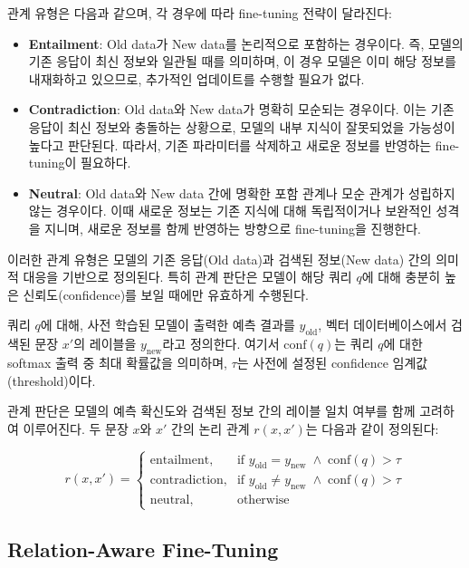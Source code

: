 \documentclass[a4paper,fleqn]{cas-sc}
\begin{document}
관계 유형은 다음과 같으며, 각 경우에 따라 fine-tuning 전략이 달라진다:

\begin{itemize}
    \item{\textbf{Entailment}:
    Old data가 New data를 논리적으로 포함하는 경우이다. 즉, 모델의 기존 응답이 최신 정보와 일관될 때를 의미하며, 이 경우 모델은 이미 해당 정보를 내재화하고 있으므로, 추가적인 업데이트를 수행할 필요가 없다.}
    \item{\textbf{Contradiction}:
    Old data와 New data가 명확히 모순되는 경우이다. 이는 기존 응답이 최신 정보와 충돌하는 상황으로, 모델의 내부 지식이 잘못되었을 가능성이 높다고 판단된다. 
    따라서, 기존 파라미터를 삭제하고 새로운 정보를 반영하는 fine-tuning이 필요하다.}
    \item{\textbf{Neutral}:
    Old data와 New data 간에 명확한 포함 관계나 모순 관계가 성립하지 않는 경우이다. 이때 새로운 정보는 기존 지식에 대해 독립적이거나 보완적인 성격을 지니며, 새로운 정보를 함께 반영하는 방향으로 fine-tuning을 진행한다.
    }
\end{itemize}  
이러한 관계 유형은 모델의 기존 응답(Old data)과 검색된 정보(New data) 간의 의미적 대응을 기반으로 정의된다.  
특히 관계 판단은 모델이 해당 쿼리 \( q \)에 대해 충분히 높은 신뢰도(confidence)를 보일 때에만 유효하게 수행된다.

쿼리 \( q \)에 대해, 사전 학습된 모델이 출력한 예측 결과를 \( y_{\text{old}} \), 벡터 데이터베이스에서 검색된 문장 \( x' \)의 레이블을 \( y_{\text{new}} \)라고 정의한다.  
여기서 \( \mathrm{conf}(q) \)는 쿼리 \( q \)에 대한 softmax 출력 중 최대 확률값을 의미하며, \( \tau \)는 사전에 설정된 confidence 임계값(threshold)이다.  

관계 판단은 모델의 예측 확신도와 검색된 정보 간의 레이블 일치 여부를 함께 고려하여 이루어진다.  
두 문장 \( x \)와 \( x' \) 간의 논리 관계 \( r(x, x') \)는 다음과 같이 정의된다:

\begin{equation}
    r(x, x') =
    \begin{cases}
    \text{entailment}, & \text{if } y_{\text{old}} = y_{\text{new}} \;\land\; \mathrm{conf}(q) > \tau \\
    \text{contradiction}, & \text{if } y_{\text{old}} \ne y_{\text{new}} \;\land\; \mathrm{conf}(q) > \tau  \\
    \text{neutral}, & \text{otherwise}
    \end{cases}
    \end{equation}


\subsection{Relation-Aware Fine-Tuning}
   
\end{document}
